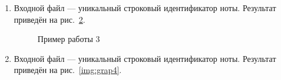\documentclass[12pt, a4paper]{article}
\begin{document}
\begin{enumerate}
\begin{figure}[h]
  		\caption{Пример работы 2}
  		\label{img:grap2}
	\end{figure}
	\newpage
	\item Входной файл --- уникальный строковый идентификатор ноты.
	Результат приведён на рис.~\ref{img:grap3}.
	\begin{figure}[h]
  		\caption{Пример работы 3}
  		\label{img:grap3}
	\end{figure}
	\newpage
	\item Входной файл --- уникальный строковый идентификатор ноты.
	Результат приведён на рис.~\ref{img:grap4}.
	\begin{figure}[h]

\end{figure}
\end{enumerate}
\end{document}
